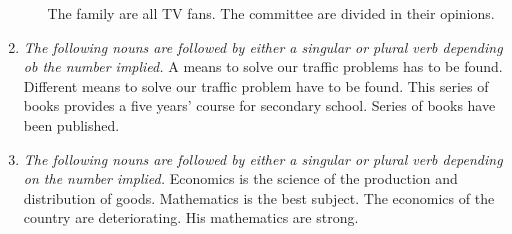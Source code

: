 \begin{enumerate}
\begin{enumerate}
                \newline
                \newline
                The family are all TV fans.
                \newline
                \newline
                The committee are divided in their opinions.
        \end{enumerate}
    \item
        {\it
        The following nouns are followed by either a singular or plural verb
        depending ob the number implied.
        }
        \newline
        \newline
        {\centering
        }
        \newline
        \newline
        A means to solve our traffic problems has to be found.
        \newline
        \newline
        Different means to solve our traffic problem have to be found.
        \newline
        \newline
        This series of books provides a five years' course for secondary school.
        \newline
        \newline
        Series of books have been published.
    \item
        {\it
        The following nouns are followed by either a singular or plural verb
        depending on the number implied.
        }
        \newline
        \newline
        {\centering
        }
        \newline
        \newline
        Economics is the science of the production and distribution of goods.
        \newline
        \newline
        Mathematics is the best subject.
        \newline
        \newline
        The economics of the country are deteriorating.
        \newline
        \newline
        His mathematics are strong.
\end{enumerate}

